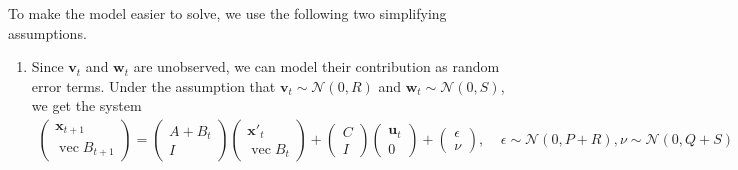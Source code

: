 \documentclass{article}
\DeclareMathOperator*{\vectorize}{vec}
\newcommand{\normal}[2]{\ensuremath{\mathcal{N}\left({{#1}},{{#2}}\right)}}
\newcommand{\w}{\mathbf{w}}
\newcommand{\x}{\mathbf{x}}
\newcommand{\uu}{\mathbf{u}}
\newcommand{\vv}{\mathbf{v}}
\begin{document}
To make the model easier to solve, we use the following two simplifying assumptions.
\begin{enumerate}
\item
Since $\vv_t$ and $\w_t$ are unobserved,
we can model their contribution as random error terms.
Under the assumption that $\vv_t\sim\normal{0}{R}$ and $\w_t\sim\normal{0}{S}$, we get the system
\begin{align}
\begin{pmatrix}
\x_{t+1} \\
\vectorize B_{t+1}
\end{pmatrix}
=
\begin{pmatrix}
A + B_t \\
I
\end{pmatrix}
\begin{pmatrix}
\x'_t \\
\vectorize B_t
\end{pmatrix}
+
\begin{pmatrix}
C \\
I
\end{pmatrix}
\begin{pmatrix}
\uu_t \\
0
\end{pmatrix}
+
\begin{pmatrix}
\epsilon \\
\nu
\end{pmatrix}
 ,~~~~~ \epsilon \sim \normal{0}{P+R}
 , \nu\sim\normal{0}{Q+S}
\end{align}



\end{enumerate}
\end{document}
